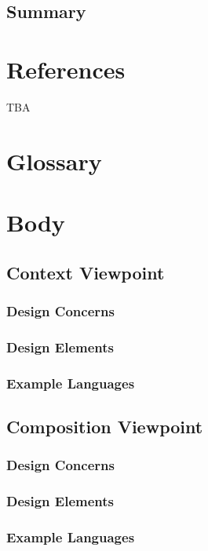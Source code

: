 \documentclass[onecolumn, draftclsnofoot,10pt, compsoc]{IEEEtran}
\begin{document}
\subsection{Summary}

\section{References}
TBA
\section{Glossary}

\section{Body}

\subsection{Context Viewpoint}
\subsubsection{Design Concerns}

\subsubsection{Design Elements}

\subsubsection{Example Languages}

\subsection{Composition Viewpoint}
\subsubsection{Design Concerns}

\subsubsection{Design Elements}

\subsubsection{Example Languages}
\end{document}

